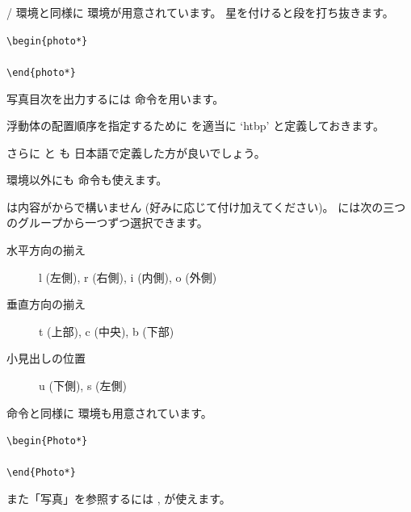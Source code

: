 / 環境と同様に  環境が用意されています。
星を付けると段を打ち抜きます。
\begin{Syntax}
\verb|\begin{photo*}|\\
\\
\verb|\end{photo*}|
\end{Syntax}

写真目次を出力するには  命令を用います。
\begin{Syntax}
\end{Syntax}

浮動体の配置順序を指定するために  を適当に
`htbp' と定義しておきます。
\begin{Syntax}
\end{Syntax}
さらに  と  も
日本語で定義した方が良いでしょう。
\begin{inputex}
\def\photoname{写真}
\def\listphotoname{写真一覧} 
\end{inputex}


 環境以外にも  命令も使えます。
\begin{Syntax}
\end{Syntax}
 は内容がからで構いません (好みに応じて付け加えてください)。
には次の三つのグループから一つずつ選択できます。
\begin{description}
 \item[水平方向の揃え ] l (左側), r (右側), i (内側), o (外側)
 \item[垂直方向の揃え ] t (上部), c (中央), b (下部)
 \item[小見出しの位置 ] u (下側), s (左側)
\end{description}

 命令と同様に  環境も用意されています。
\begin{Syntax}
 \verb|\begin{Photo*}|%
   \\
   \\
 \verb|\end{Photo*}|
\end{Syntax}

また「写真」を参照するには ,  が使えます。
\begin{Syntax}
 \\
  
\end{Syntax}

